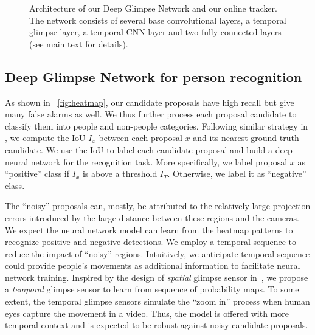 \documentclass{article}
\begin{document}
\begin{figure*}
	\begin{center}
		\hspace{1cm}\end{center}
	\caption{Architecture of our Deep Glimpse Network and our online tracker. The network consists of several base convolutional layers, a temporal glimpse layer, a temporal CNN layer and two fully-connected layers (see main text for details). }
	
\end{figure*}
\subsection{Deep Glimpse Network for person recognition}
As shown in \figurename{~\ref{fig:heatmap}}, our candidate proposals have high recall but
give many false alarms as well.
We thus further process each proposal candidate to classify them into people and non-people categories. 
Following similar strategy in \cite{Girshick_2014_CVPR},
we compute the IoU $I_x$ between each proposal $x$ and its nearest ground-truth candidate.
We use the IoU to label each candidate proposal and build a deep neural network for the recognition task. More specifically, we label proposal $x$ as ``positive'' class if $I_x$ is above a threshold $I_T$. Otherwise, we label it as ``negative'' class.


The ``noisy'' proposals can, mostly, be attributed to the relatively large projection errors
introduced by the large distance between these regions and the cameras. We expect the neural network model can learn from the heatmap patterns to recognize positive and
negative detections.
We employ a temporal sequence to reduce the impact of ``noisy'' regions.
Intuitively, we anticipate temporal sequence could provide people's movements as additional information to facilitate neural network training.
Inspired by the design of \textit{spatial} glimpse sensor in~\cite{mnih2014recurrent}, we propose a \textit{temporal} glimpse sensor to learn from sequence of probability maps.
To some extent, the temporal glimpse sensors simulate the ``zoom in'' process when human eyes capture the movement in a video. Thus, the model is offered with
more temporal context and is expected to be robust against noisy candidate proposals.
\end{document}
